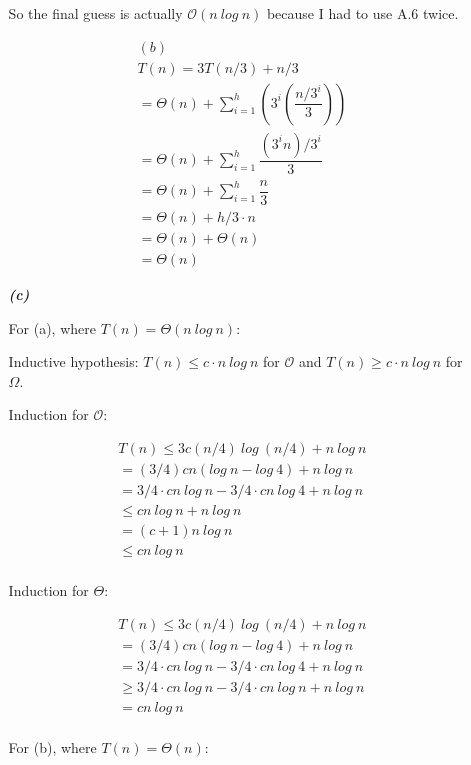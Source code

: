 \documentclass{article}
\begin{document}
\begin{enumerate}
\begin{enumerate}
		So the final guess is actually $\mathcal{O}(n\ log\ n)$ because I had to
		use A.6 twice.

		\begin{align*}
		& (b) \\
		& T(n) = 3T(n/3) + n/3 \\
		& = \Theta(n) + \sum_{i=1}^h (3^i (\dfrac{n/3^i}{3})) \\
		& = \Theta(n) + \sum_{i=1}^h \dfrac{(3^i n)/3^i}{3} \\
		& = \Theta(n) + \sum_{i=1}^h \dfrac{n}{3} \\
		& = \Theta(n) + h/3 \cdot n \\
		& = \Theta(n) + \Theta(n) \\
		& = \Theta(n)
		\end{align*}

		\item[\textbf{\emph{{(c)}}}]

		For (a), where $T(n) = \Theta(n\ log\ n)$:

		Inductive hypothesis: $T(n) \leq c \cdot n\ log\ n$ for $\mathcal{O}$ and $T(n) \geq c \cdot n\ log\ n$ for $\Omega$.

		Induction for $\mathcal{O}$:

		\begin{align*}
		& T(n) \leq 3c(n/4)\ log\ (n/4) + n\ log\ n \\
		&  = (3/4)cn(log\ n - log\ 4) + n\ log\ n \\
		&  = 3/4\cdot cn\ log\ n - 3/4\cdot cn\ log\ 4 + n\ log\ n \\
		&  \leq cn\ log\ n + n\ log\ n \\
		&  = (c+1)n\ log\ n \\
		&  \leq cn\ log\ n \\
		\end{align*}

		Induction for $\Theta$:

		\begin{align*}
		& T(n) \leq 3c(n/4)\ log\ (n/4) + n\ log\ n \\
		&  = (3/4)cn(log\ n - log\ 4) + n\ log\ n \\
		&  = 3/4\cdot cn\ log\ n - 3/4\cdot cn\ log\ 4 + n\ log\ n \\
		&  \geq 3/4\cdot cn\ log\ n - 3/4\cdot cn\ log\ n + n\ log\ n \\
		&  = cn\ log\ n \\
		\end{align*}

		For (b), where $T(n) = \Theta(n)$:


\end{enumerate}
\end{enumerate}
\end{document}
